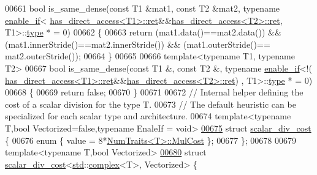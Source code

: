 \begin{DoxyCode}
{00661 \textcolor{keywordtype}{bool} is\_same\_dense(\textcolor{keyword}{const} T1 &mat1, \textcolor{keyword}{const} T2 &mat2, \textcolor{keyword}{typename} \hyperlink{struct_eigen_1_1internal_1_1enable__if}{enable\_if}<
      \hyperlink{struct_eigen_1_1internal_1_1has__direct__access}{has\_direct\_access<T1>::ret}&&\hyperlink{struct_eigen_1_1internal_1_1has__direct__access}{has\_direct\_access<T2>::ret},
       T1>::\hyperlink{struct_eigen_1_1_triangular_shape}{type} * = 0)
00662 \{
00663   \textcolor{keywordflow}{return} (mat1.data()==mat2.data()) && (mat1.innerStride()==mat2.innerStride()) && (mat1.outerStride()==
      mat2.outerStride());
00664 \}
00665 
00666 \textcolor{keyword}{template}<\textcolor{keyword}{typename} T1, \textcolor{keyword}{typename} T2>
00667 \textcolor{keywordtype}{bool} is\_same\_dense(\textcolor{keyword}{const} T1 &, \textcolor{keyword}{const} T2 &, \textcolor{keyword}{typename} \hyperlink{struct_eigen_1_1internal_1_1enable__if}{enable\_if}<!(
      \hyperlink{struct_eigen_1_1internal_1_1has__direct__access}{has\_direct\_access<T1>::ret}&&\hyperlink{struct_eigen_1_1internal_1_1has__direct__access}{has\_direct\_access<T2>::ret})
      , T1>::\hyperlink{struct_eigen_1_1_triangular_shape}{type} * = 0)
00668 \{
00669   \textcolor{keywordflow}{return} \textcolor{keyword}{false};
00670 \}
00671 
00672 \textcolor{comment}{// Internal helper defining the cost of a scalar division for the type T.}
00673 \textcolor{comment}{// The default heuristic can be specialized for each scalar type and architecture.}
00674 \textcolor{keyword}{template}<\textcolor{keyword}{typename} T,\textcolor{keywordtype}{bool} Vectorized=false,\textcolor{keyword}{typename} EnaleIf = \textcolor{keywordtype}{void}>
\hyperlink{struct_eigen_1_1internal_1_1scalar__div__cost}{00675} \textcolor{keyword}{struct }\hyperlink{struct_eigen_1_1internal_1_1scalar__div__cost}{scalar\_div\_cost} \{
00676   \textcolor{keyword}{enum} \{ value = 8*\hyperlink{group___core___module_struct_eigen_1_1_num_traits}{NumTraits<T>::MulCost} \};
00677 \};
00678 
00679 \textcolor{keyword}{template}<\textcolor{keyword}{typename} T,\textcolor{keywordtype}{bool} Vectorized>
\hyperlink{struct_eigen_1_1internal_1_1scalar__div__cost_3_01std_1_1complex_3_01_t_01_4_00_01_vectorized_01_4}{00680} \textcolor{keyword}{struct }\hyperlink{struct_eigen_1_1internal_1_1scalar__div__cost}{scalar\_div\_cost}<\hyperlink{namespacestd}{std}::\hyperlink{structcomplex}{complex}<T>, Vectorized> \{
}
\end{DoxyCode}
